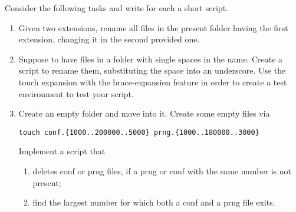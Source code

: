 
    Consider the following tasks and write for each a short script.
    \begin{enumerate}[after=\vspace{-0.6\baselineskip}]
        \item Given two extensions, rename all files in the present folder having the first extension, changing it in the second provided one.
        \item Suppose to have files in a folder with single spaces in the name. Create a script to rename them, substituting the space into an underscore.
              Use the touch expansion with the brace-expansion feature in order to create a test environment to test your script.
        \item Create an empty folder and move into it.
              Create some empty files via
              \begin{lstlisting}[style=MyBash, numbers=none]
                  touch conf.{1000..200000..5000} prng.{1000..180000..3000}
              \end{lstlisting}
              Implement a script that
              \begin{enumerate}[after=\vspace{-0.6\baselineskip}]
                  \item deletes conf or prng files, if a prng or conf with the same number is not present;
                  \item find the largest number for which both a conf and a prng file exits.
              \end{enumerate}
    \end{enumerate}
\EndExercise[DodgerBlue]
